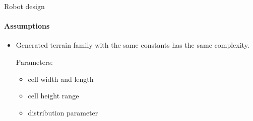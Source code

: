 \documentclass[aspectratio=169]{beamer}
\begin{document}
\begin{frame}[t]{Robot design}
    \framesubtitle{Assumptions}
    \Large
    \begin{itemize}
        \item Generated terrain family with the same constants has the same complexity. 
        
        Parameters:
              \begin{itemize}
                  \item cell width and length
                  \item cell height range
                  \item distribution parameter
              \end{itemize}
    \end{itemize}
\end{frame}
\end{document}
